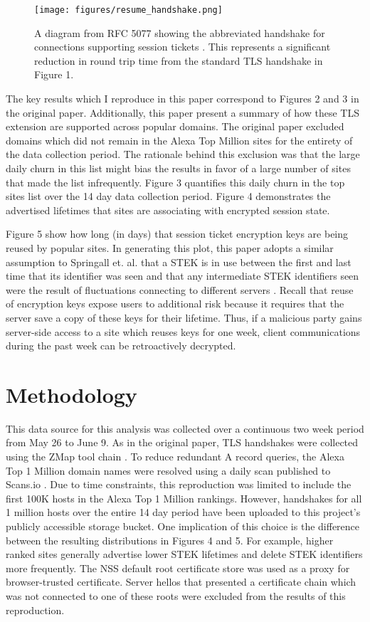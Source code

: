     \begin{figure}[hp]
    \centering
    \texttt{[image: figures/resume\_handshake.png]}
    \caption{A diagram from RFC 5077 showing the abbreviated handshake for connections supporting session tickets \cite{RFC5077}. This represents a significant reduction in round trip time from the standard TLS handshake in Figure 1.}
    \end{figure}
    

The key results which I reproduce in this paper correspond to Figures 2 and 3 in the original paper. Additionally, this paper present a summary of how these TLS extension are supported across popular domains. The original paper excluded domains which did not remain in the Alexa Top Million sites for the entirety of the data collection period. The rationale behind this exclusion was that the large daily churn in this list might bias the results in favor of a large number of sites that made the list infrequently. Figure 3 quantifies this daily churn in the top sites list over the 14 day data collection period. Figure 4 demonstrates the advertised lifetimes that sites are associating with encrypted session state. 

Figure 5 show how long (in days) that session ticket encryption keys are being  reused by popular sites.  In generating this plot, this paper adopts a similar assumption to Springall et. al.
that a STEK is in use between the first and last time
that its identifier was seen and that any intermediate STEK
identifiers seen were the result of fluctuations connecting to
different servers \cite{Springall:2016:MSH:2987443.2987480}. Recall that reuse of encryption keys expose users to additional risk because it requires that the server save a copy of these keys for their lifetime. Thus, if a malicious party gains server-side access to a site which reuses keys for one week, client communications during the past week can be retroactively decrypted. 

\section{Methodology}
This data source for this analysis was collected over a continuous two week period from May 26 to June 9. As in the original paper, TLS handshakes were collected using the ZMap tool chain \cite{durumeric2013zmap}. To reduce redundant A record queries, the Alexa Top 1 Million domain names were resolved using a daily scan published to Scans.io \cite{durumericinternet}. Due to time constraints, this reproduction was limited to include the first 100K hosts in the Alexa Top 1 Million rankings. However, handshakes for all 1 million hosts over the entire 14 day period have been uploaded to this project's publicly accessible storage bucket. One implication of this choice is the difference between the resulting distributions in Figures 4 and 5. For example, higher ranked sites generally advertise lower STEK lifetimes and delete STEK identifiers more frequently. The NSS default root certificate store was used as a proxy for browser-trusted certificate. Server hellos that presented a certificate chain which was not connected to one of these roots were excluded from the results of this reproduction. 

